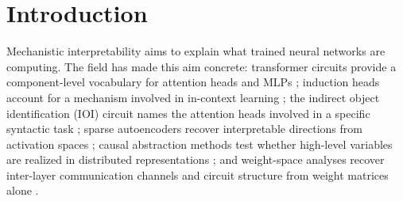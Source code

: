 \documentclass{article}
\begin{document}
\newpage
{\small\setlength{\parskip}{0pt}\setcounter{tocdepth}{3}\tableofcontents}
\newpage

\section{Introduction}

Mechanistic interpretability aims to explain what trained neural
networks are computing.  The field has made this aim concrete:
transformer circuits provide a component-level vocabulary for attention
heads and MLPs \citep{elhage2021}; induction heads account for a
mechanism involved in in-context learning \citep{olsson2022}; the
indirect object identification (IOI) circuit names the attention heads
involved in a specific syntactic task \citep{wang2022}; sparse
autoencoders recover interpretable directions from activation spaces
\citep{bricken2023,templeton2024}; causal abstraction methods test
whether high-level variables are realized in distributed representations
\citep{geiger2021,geiger2024}; and weight-space analyses recover
inter-layer communication channels and circuit structure from weight
matrices alone \citep{merullo2024,elhage2021}.
\end{document}
